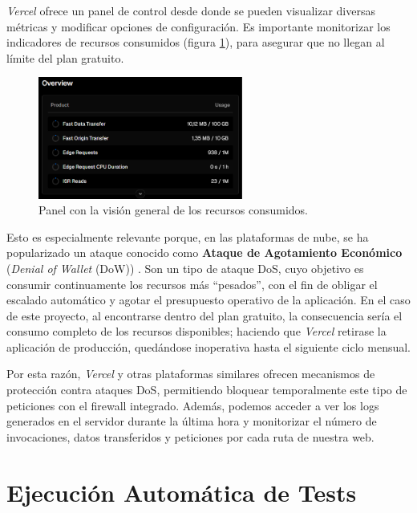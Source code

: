 \textit{Vercel} ofrece un panel de control desde donde se pueden visualizar diversas métricas y modificar opciones de configuración. Es importante monitorizar los indicadores de recursos consumidos (figura \ref{fig:usage_overview}), para asegurar que no llegan al límite del plan gratuito.

\begin{figure}[H]
    \centering
    \includegraphics[width=0.6\textwidth]{figures/despliegue/usage_overview.png}
    \vspace{0.3cm}
    \caption{Panel con la visión general de los recursos consumidos.}
    \label{fig:usage_overview}
\end{figure}

\newpage

Esto es especialmente relevante porque, en las plataformas de nube, se ha popularizado un ataque conocido como \textbf{Ataque de Agotamiento Económico} (\textit{Denial of Wallet} (DoW)) \cite{vercelDoW2025}. Son un tipo de ataque DoS, cuyo objetivo es consumir continuamente los recursos más ``pesados'', con el fin de obligar el escalado automático y agotar el presupuesto operativo de la aplicación. En el caso de este proyecto, al encontrarse dentro del plan gratuito, la consecuencia sería el consumo completo de los recursos disponibles; haciendo que \textit{Vercel} retirase la aplicación de producción, quedándose inoperativa hasta el siguiente ciclo mensual.

Por esta razón, \textit{Vercel} y otras plataformas similares ofrecen mecanismos de protección contra ataques DoS, permitiendo bloquear temporalmente este tipo de peticiones con el firewall integrado. Además, podemos acceder a ver los logs generados en el servidor durante la última hora y monitorizar el número de invocaciones, datos transferidos y peticiones por cada ruta de nuestra web.

\section{Ejecución Automática de Tests} \label{sec:test_automaticos}

